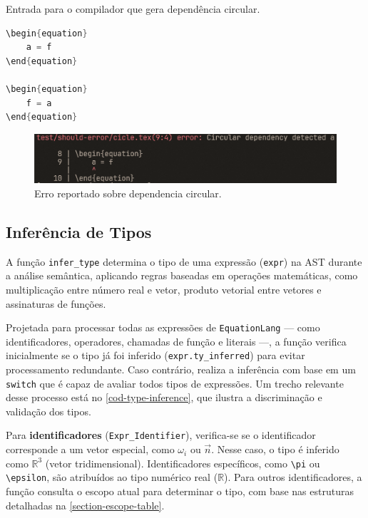 \begin{codigo}[H]
    \caption{\small Entrada para o compilador que gera dependência circular.}
    \label{cod-grafo-simbol-deps}
\begin{lstlisting}[language=C, numbers=none, frame=none, inputencoding=latin1]
\begin{equation}
    a = f
\end{equation}

\begin{equation}
    f = a
\end{equation}

\end{lstlisting}
\end{codigo}

\begin{figure}[H]
    \caption{\label{label} \small Erro reportado sobre dependencia circular.}
    \begin{center}
        \includegraphics[scale=0.5]{./Imagens/error-circular-deps.png}
    \end{center}
\end{figure}


\subsection{Inferência de Tipos} \label{subsection-type-inference}


A função \verb`infer_type` determina o tipo de uma expressão (\verb`expr`) na AST durante a análise semântica, aplicando regras baseadas em operações matemáticas, como multiplicação entre número real e vetor, produto vetorial entre vetores e assinaturas de funções. 

Projetada para processar todas as expressões de \texttt{EquationLang} — como identificadores, operadores, chamadas de função e literais —, a função verifica inicialmente se o tipo já foi inferido (\verb"expr.ty_inferred") para evitar processamento redundante. Caso contrário, realiza a inferência com base em um \verb"switch" que é capaz de avaliar todos tipos de expressões. Um trecho relevante desse processo está no \autoref{cod-type-inference}, que ilustra a discriminação e validação dos tipos.

Para \textbf{identificadores} (\verb"Expr_Identifier"), verifica-se se o identificador corresponde a um vetor especial, como $\omega_i$ ou $\vec{n}$. Nesse caso, o tipo é inferido como $\mathbb{R}^3$ (vetor tridimensional). Identificadores específicos, como \verb"\pi" ou \verb"\epsilon", são atribuídos ao tipo numérico real ($\mathbb{R}$). Para outros identificadores, a função consulta o escopo atual para determinar o tipo, com base nas estruturas detalhadas na \autoref{section-escope-table}.

